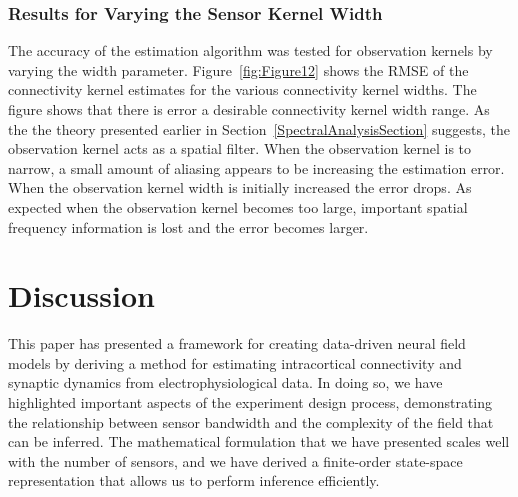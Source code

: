 \documentclass[12pt]{iopart}
\begin{document}
\subsubsection{Results for Varying the Sensor Kernel Width}
The accuracy of the estimation algorithm was tested for observation kernels by varying the width parameter. Figure~\ref{fig:Figure12} shows the RMSE of the connectivity kernel estimates for the various connectivity kernel widths. The figure shows that there is error a desirable connectivity kernel width range. As the the theory presented earlier in Section~\ref{SpectralAnalysisSection} suggests, the observation kernel acts as a spatial filter. When the observation kernel is to narrow, a small amount of aliasing appears to be increasing the estimation error. When the observation kernel width is initially increased the error drops. As expected when the observation kernel becomes too large, important spatial frequency information is lost and the error becomes larger.  

\section{Discussion}\label{DiscussionSection}
This paper has presented a framework for creating data-driven neural field models by deriving a method for estimating intracortical connectivity and synaptic dynamics from electrophysiological data. In doing so, we have highlighted important aspects of the experiment design process, demonstrating the relationship between sensor bandwidth and the complexity of the field that can be inferred. The mathematical formulation that we have presented scales well with the number of sensors, and we have derived a finite-order state-space representation that allows us to perform inference efficiently. 
\end{document}
